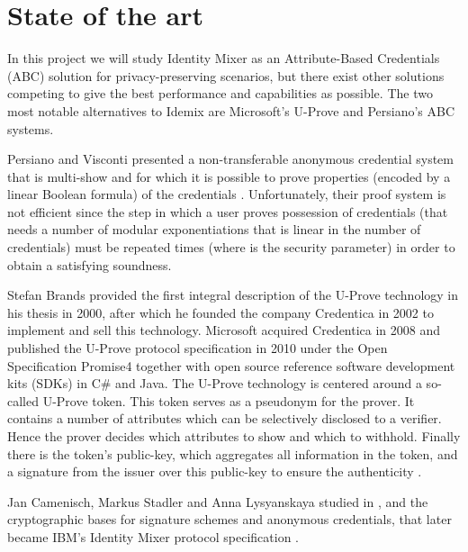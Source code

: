 \documentclass[journal]{IEEEtran}
\begin{document}
\section{State of the art}\label{ch:stateoftheart}

In this project we will study Identity Mixer as an Attribute-Based Credentials (ABC) solution for privacy-preserving scenarios, but there exist other solutions competing to give the best performance and capabilities as possible. The two most notable alternatives to Idemix are Microsoft's U-Prove and Persiano's ABC systems.




Persiano and Visconti presented a non-transferable anonymous
credential system that is multi-show and for which it is possible to prove
properties (encoded by a linear Boolean formula) of the credentials \cite{book:185217}. Unfortunately, their proof system is not efficient since the step in which a user proves
possession of credentials (that needs a number of modular exponentiations that
is linear in the number of credentials) must be repeated times (where is the
security parameter) in order to obtain a satisfying soundness.





Stefan Brands provided the first integral description of the U-Prove
technology in his thesis \cite{uprove} in 2000, after which he founded the company Credentica
in 2002 to implement and sell this technology. Microsoft acquired Credentica
in 2008 and published the U-Prove protocol specification \cite{uprove2} in 2010
under the Open Specification Promise4 together with open source reference software
development kits (SDKs) in C\# and Java.
The U-Prove technology is centered around a so-called U-Prove token. This
token serves as a pseudonym for the prover. It contains a number of attributes
which can be selectively disclosed to a verifier. Hence the prover decides which
attributes to show and which to withhold. Finally there is the token’s public-key, which aggregates all information in the token, and a signature from the issuer
over this public-key to ensure the authenticity \cite{book:947508}.



\hfil

Jan Camenisch, Markus Stadler and Anna Lysyanskaya studied in \cite{Camenisch:GroupSig}, \cite{Camenisch:AnonCred} and \cite{camenisch2002signature} the cryptographic bases for signature schemes and anonymous credentials, that later became IBM's Identity Mixer protocol specification \cite{idemixSpec}.
\end{document}
